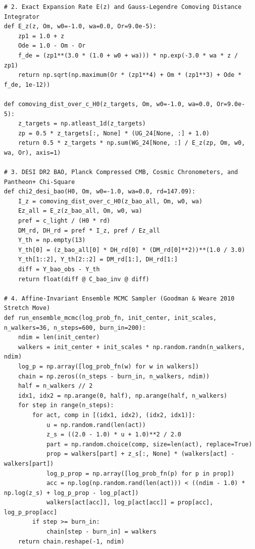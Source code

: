 \documentclass[11pt,letterpaper]{article}
\begin{document}
\begin{lstlisting}
# 2. Exact Expansion Rate E(z) and Gauss-Legendre Comoving Distance Integrator
def E_z(z, Om, w0=-1.0, wa=0.0, Or=9.0e-5):
    zp1 = 1.0 + z
    Ode = 1.0 - Om - Or
    f_de = (zp1**(3.0 * (1.0 + w0 + wa))) * np.exp(-3.0 * wa * z / zp1)
    return np.sqrt(np.maximum(Or * (zp1**4) + Om * (zp1**3) + Ode * f_de, 1e-12))

def comoving_dist_over_c_H0(z_targets, Om, w0=-1.0, wa=0.0, Or=9.0e-5):
    z_targets = np.atleast_1d(z_targets)
    zp = 0.5 * z_targets[:, None] * (UG_24[None, :] + 1.0)
    return 0.5 * z_targets * np.sum(WG_24[None, :] / E_z(zp, Om, w0, wa, Or), axis=1)

# 3. DESI DR2 BAO, Planck Compressed CMB, Cosmic Chronometers, and Pantheon+ Chi-Square
def chi2_desi_bao(H0, Om, w0=-1.0, wa=0.0, rd=147.09):
    I_z = comoving_dist_over_c_H0(z_bao_all, Om, w0, wa)
    Ez_all = E_z(z_bao_all, Om, w0, wa)
    pref = c_light / (H0 * rd)
    DM_rd, DH_rd = pref * I_z, pref / Ez_all
    Y_th = np.empty(13)
    Y_th[0] = (z_bao_all[0] * DH_rd[0] * (DM_rd[0]**2))**(1.0 / 3.0)
    Y_th[1::2], Y_th[2::2] = DM_rd[1:], DH_rd[1:]
    diff = Y_bao_obs - Y_th
    return float(diff @ C_bao_inv @ diff)

# 4. Affine-Invariant Ensemble MCMC Sampler (Goodman & Weare 2010 Stretch Move)
def run_ensemble_mcmc(log_prob_fn, init_center, init_scales, n_walkers=36, n_steps=600, burn_in=200):
    ndim = len(init_center)
    walkers = init_center + init_scales * np.random.randn(n_walkers, ndim)
    log_p = np.array([log_prob_fn(w) for w in walkers])
    chain = np.zeros((n_steps - burn_in, n_walkers, ndim))
    half = n_walkers // 2
    idx1, idx2 = np.arange(0, half), np.arange(half, n_walkers)
    for step in range(n_steps):
        for act, comp in [(idx1, idx2), (idx2, idx1)]:
            u = np.random.rand(len(act))
            z_s = ((2.0 - 1.0) * u + 1.0)**2 / 2.0
            part = np.random.choice(comp, size=len(act), replace=True)
            prop = walkers[part] + z_s[:, None] * (walkers[act] - walkers[part])
            log_p_prop = np.array([log_prob_fn(p) for p in prop])
            acc = np.log(np.random.rand(len(act))) < ((ndim - 1.0) * np.log(z_s) + log_p_prop - log_p[act])
            walkers[act[acc]], log_p[act[acc]] = prop[acc], log_p_prop[acc]
        if step >= burn_in:
            chain[step - burn_in] = walkers
    return chain.reshape(-1, ndim)


\end{lstlisting}
\end{document}
